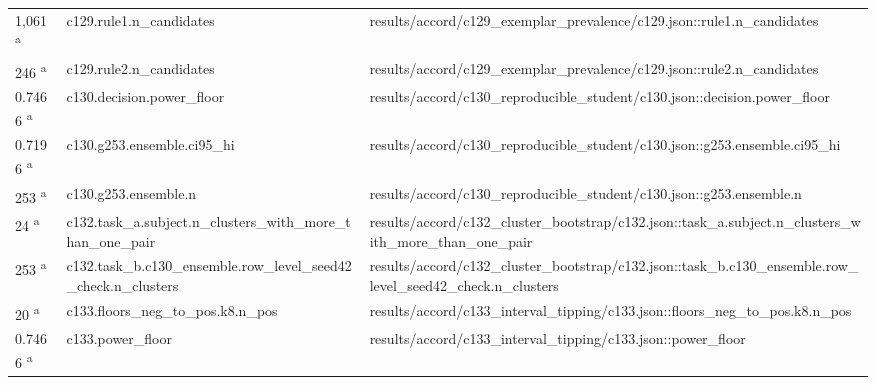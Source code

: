 \begin{longtable}{@{}p{0.7in}p{1.9in}p{2.6in}@{}}
1,061 \textsuperscript{a} & c129.\allowbreak{}rule1.\allowbreak{}n\_candidates & results/\allowbreak{}accord/\allowbreak{}c129\_exemplar\_prevalence/\allowbreak{}c129.\allowbreak{}json::rule1.\allowbreak{}n\_candidates\\
246 \textsuperscript{a} & c129.\allowbreak{}rule2.\allowbreak{}n\_candidates & results/\allowbreak{}accord/\allowbreak{}c129\_exemplar\_prevalence/\allowbreak{}c129.\allowbreak{}json::rule2.\allowbreak{}n\_candidates\\
0.7466 \textsuperscript{a} & c130.\allowbreak{}decision.\allowbreak{}power\_floor & results/\allowbreak{}accord/\allowbreak{}c130\_reproducible\_student/\allowbreak{}c130.\allowbreak{}json::decision.\allowbreak{}power\_floor\\
0.7196 \textsuperscript{a} & c130.\allowbreak{}g253.\allowbreak{}ensemble.\allowbreak{}ci95\_hi & results/\allowbreak{}accord/\allowbreak{}c130\_reproducible\_student/\allowbreak{}c130.\allowbreak{}json::g253.\allowbreak{}ensemble.\allowbreak{}ci95\_hi\\
253 \textsuperscript{a} & c130.\allowbreak{}g253.\allowbreak{}ensemble.\allowbreak{}n & results/\allowbreak{}accord/\allowbreak{}c130\_reproducible\_student/\allowbreak{}c130.\allowbreak{}json::g253.\allowbreak{}ensemble.\allowbreak{}n\\
24 \textsuperscript{a} & c132.\allowbreak{}task\_a.\allowbreak{}subject.\allowbreak{}n\_clusters\_with\_more\_than\_one\_pair & results/\allowbreak{}accord/\allowbreak{}c132\_cluster\_bootstrap/\allowbreak{}c132.\allowbreak{}json::task\_a.\allowbreak{}subject.\allowbreak{}n\_clusters\_with\_more\_than\_one\_pair\\
253 \textsuperscript{a} & c132.\allowbreak{}task\_b.\allowbreak{}c130\_ensemble.\allowbreak{}row\_level\_seed42\_check.\allowbreak{}n\_clusters & results/\allowbreak{}accord/\allowbreak{}c132\_cluster\_bootstrap/\allowbreak{}c132.\allowbreak{}json::task\_b.\allowbreak{}c130\_ensemble.\allowbreak{}row\_level\_seed42\_check.\allowbreak{}n\_clusters\\
20 \textsuperscript{a} & c133.\allowbreak{}floors\_neg\_to\_pos.\allowbreak{}k8.\allowbreak{}n\_pos & results/\allowbreak{}accord/\allowbreak{}c133\_interval\_tipping/\allowbreak{}c133.\allowbreak{}json::floors\_neg\_to\_pos.\allowbreak{}k8.\allowbreak{}n\_pos\\
0.7466 \textsuperscript{a} & c133.\allowbreak{}power\_floor & results/\allowbreak{}accord/\allowbreak{}c133\_interval\_tipping/\allowbreak{}c133.\allowbreak{}json::power\_floor\\

\end{longtable}

